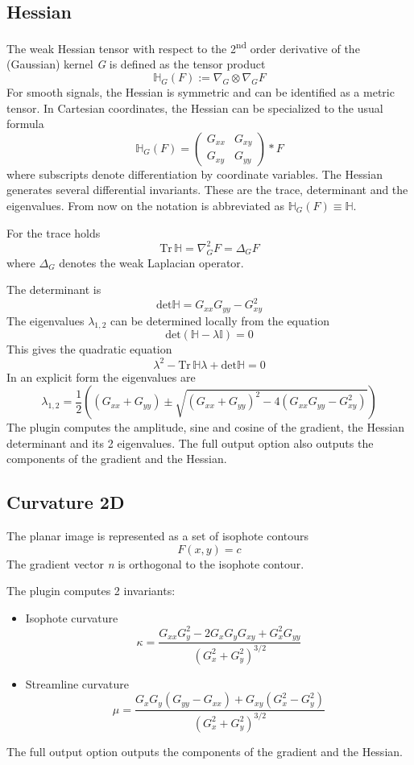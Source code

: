 \documentclass{amsart}
\begin{document}
\subsection{Hessian}\label{sec:hessian}

The weak Hessian tensor with respect to the 2\textsuperscript{nd} order derivative of the (Gaussian) kernel \textit{G} is defined as the tensor product
\[
\mathbb{H}_G (F) := \nabla_G \otimes \nabla_G F
\]
For smooth signals, the Hessian is symmetric and can be identified as a metric tensor.
In Cartesian coordinates, the Hessian can be specialized to the usual formula
\[
\mathbb{H}_G (F)=  \left( \begin{array}{ll}
	G_{xx}  & G_{xy} \\
	G_{xy} & G_{yy}
\end{array} \right) \ast F 
\]
where  subscripts denote differentiation by coordinate variables. 
The Hessian generates several  differential invariants.
These are the trace, determinant and the eigenvalues. From now on the notation is abbreviated as $\mathbb{H}_G (F)\equiv \mathbb{H} $.

For the trace holds 
\[
\mathrm{Tr} \,\mathbb{H} = \nabla_G^2 F = \Delta_{G} F
\]
where $ \Delta_{G}$ denotes the weak Laplacian operator.  

The determinant is
\[
\mathrm{det} \mathbb{H}  = G_{xx} G_{yy}- G_{xy}^2
\]
The eigenvalues $\lambda_{1,2}$ can be determined locally from the equation 
\[
	\mathrm{det} (\mathbb{H} - \lambda \mathbb{I} )= 0
\]
This gives the quadratic equation
\[
\lambda^2 - \mathrm{Tr} \,\mathbb{H}  \lambda + 	\mathrm{det} \mathbb{H} =  0
\]
In an explicit form the eigenvalues are
\[
\lambda_{1,2}=\frac{1}{2} \left( (G_{xx} + G_{yy}) \pm \sqrt{(G_{xx} + G_{yy})^2 - 4   \left(  G_{xx} G_{yy}- G_{xy}^2 \right)  } \right) 
\]
The plugin computes the amplitude, sine and cosine of the gradient, the Hessian determinant and its 2 eigenvalues. 
The full output option also outputs the components of the gradient and the Hessian.
\subsection{Curvature 2D}
The planar image is represented as a set of isophote contours
\[
F(x,y) = c
\]
The gradient vector \textit{n} is orthogonal to the isophote contour.

The plugin computes 2 invariants:
\begin{itemize}
	\item Isophote curvature
	\[  
	\kappa= \frac{ G_{xx} G_{y}^2 - 2 G_{x} G_{y} G_{xy} + G_{x}^2 G_{yy}}   {\left(  G_{x}^2 +G_{y}^2\right)^{3/2}}
	\]
	\item Streamline curvature
	\[
	\mu = \frac{ G_x G_y \left(  G_{yy} -  G_{xx} \right) +G_{xy}\left(   G_x^2  -  G_y^2\right)    }   {\left(  G_{x}^2 +G_{y}^2\right)^{3/2}}
	\]
\end{itemize}
The full output option outputs the components of the gradient and the Hessian.
\end{document}
